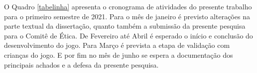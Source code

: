 O Quadro \ref{tabelinha} apresenta o cronograma de atividades do presente trabalho para o primeiro semestre de 2021. Para o mês de janeiro é previsto alterações na parte textual da dissertação, quanto também a submissão da presente pesquisa para o Comitê de Ética. De Fevereiro até Abril é esperado o início e conclusão do desenvolvimento do jogo. Para Março é prevista a etapa de validação com crianças do jogo. E por fim no mês de junho se espera a documentação dos principais achados e a defesa da presente pesquisa. 






